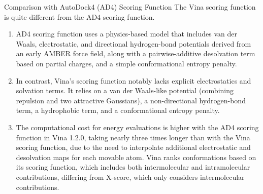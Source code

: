 \documentclass[11pt]{article}
\begin{document}
Comparison with AutoDock4 (AD4) Scoring Function The Vina scoring function is quite different from the AD4 scoring function.
\begin{enumerate}
\item AD4 scoring function uses a physics-based model that includes van der Waals, electrostatic, and directional hydrogen-bond potentials derived from an early AMBER force field, along with a pairwise-additive desolvation term based on partial charges, and a simple conformational entropy penalty.
\item In contrast, Vina's scoring function notably lacks explicit electrostatics and solvation terms. It relies on a van der Waals-like potential (combining repulsion and two attractive Gaussians), a non-directional hydrogen-bond term, a hydrophobic term, and a conformational entropy penalty.
\item The computational cost for energy evaluations is higher with the AD4 scoring function in Vina 1.2.0, taking nearly three times longer than with the Vina scoring function, due to the need to interpolate additional electrostatic and desolvation maps for each movable atom. Vina ranks conformations based on its scoring function, which includes both intermolecular and intramolecular contributions, differing from X-score, which only considers intermolecular contributions.
\end{enumerate}
\end{document}
